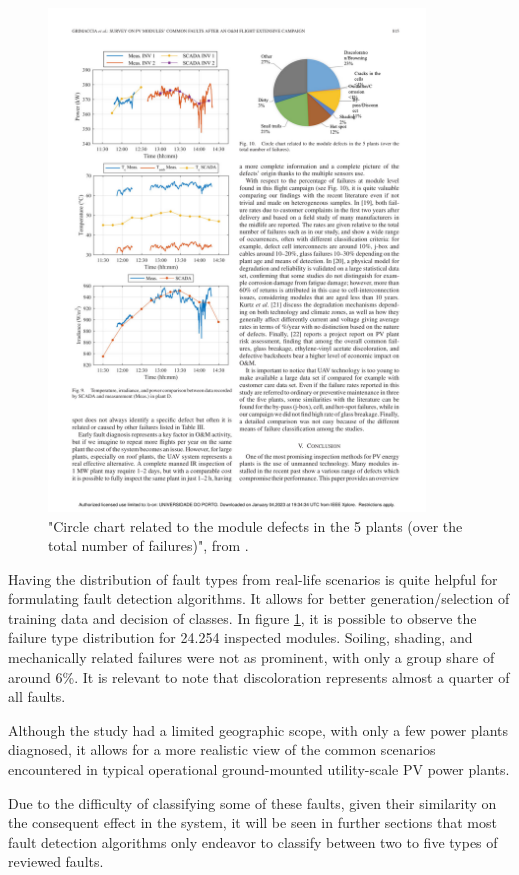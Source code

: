 \begin{figure}[h]
    \centering
    \includegraphics[width=10cm, trim={11cm 20.6cm 2.4cm 2cm},
    clip]{figures/chapter2/chartfailsurvey.pdf} \caption{"Circle chart related to the module defects in the 5 plants
    (over the total number of failures)", from \cite{Grimaccia2017}.}
    \label{fig:faultchart}
\end{figure}

Having the distribution of fault types from real-life scenarios is quite helpful for formulating fault detection algorithms. It allows for better generation/selection of training data and decision of classes. In figure \ref{fig:faultchart}, it is possible to observe the failure type distribution for 24.254 inspected modules. Soiling, shading, and mechanically related failures were not as prominent, with only a group share of around 6\%. It is relevant to note that discoloration represents almost a quarter of all faults.

Although the study had a limited geographic scope, with only a few power plants diagnosed, it allows for a more realistic view of the common scenarios encountered in typical operational ground-mounted utility-scale PV power plants.

Due to the difficulty of classifying some of these faults, given their similarity on the consequent effect in the system, it will be seen in further sections that most fault detection algorithms only endeavor to classify between two to five types of reviewed faults.

